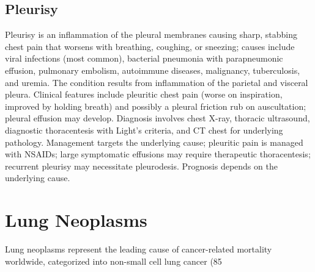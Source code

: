 \subsection{Pleurisy}
\label{sec:Pleurisy}
Pleurisy is an inflammation of the pleural membranes causing sharp, stabbing chest pain that worsens with breathing, coughing, or sneezing; causes include viral infections (most common), bacterial pneumonia with parapneumonic effusion, pulmonary embolism, autoimmune diseases, malignancy, tuberculosis, and uremia. The condition results from inflammation of the parietal and visceral pleura. Clinical features include pleuritic chest pain (worse on inspiration, improved by holding breath) and possibly a pleural friction rub on auscultation; pleural effusion may develop. Diagnosis involves chest X-ray, thoracic ultrasound, diagnostic thoracentesis with Light's criteria, and CT chest for underlying pathology. Management targets the underlying cause; pleuritic pain is managed with NSAIDs; large symptomatic effusions may require therapeutic thoracentesis; recurrent pleurisy may necessitate pleurodesis. Prognosis depends on the underlying cause.

\section{Lung Neoplasms}




Lung neoplasms represent the leading cause of cancer-related mortality worldwide, categorized into non-small cell lung cancer (85%




